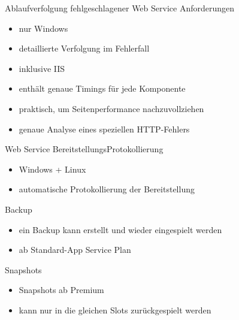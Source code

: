 \begin{flashcard}[Definition]{Ablaufverfolgung fehlgeschlagener Web Service Anforderungen}
    \begin{itemize}
        \item[!] nur Windows
        \item detaillierte Verfolgung im Fehlerfall
        \item inklusive IIS
        \item enthält genaue Timings für jede Komponente
        \item praktisch, um Seitenperformance nachzuvollziehen
        \item genaue Analyse eines speziellen HTTP-Fehlers
    \end{itemize}
\end{flashcard}

\begin{flashcard}[Definition]{Web Service BereitstellungsProtokollierung}
    \begin{itemize}
        \item Windows + Linux
        \item automatische Protokollierung der Bereitstellung
    \end{itemize}
\end{flashcard}

\begin{flashcard}[Definition]{Backup}
    \begin{itemize}
        \item ein Backup kann erstellt und wieder eingespielt werden
        \item ab Standard-App Service Plan
    \end{itemize}
\end{flashcard}

\begin{flashcard}[Definition]{Snapshots}
    \begin{itemize}
        \item Snapshots ab Premium
        \item kann nur in die gleichen Slots zurückgespielt werden
    \end{itemize}
\end{flashcard}

